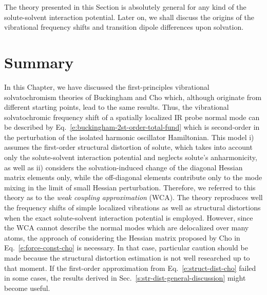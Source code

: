 \documentclass[a4paper,titlepage,twoside,fleqn,12pt]{book}
\begin{document}
\begin{refsection}
The theory presented in this Section is absolutely general 
for any kind of the solute\hyp{}solvent
interaction potential. Later on, we shall discuss the origins of the
vibrational frequency shifts and transition dipole differences
upon solvation.


\section{Summary}

In this Chapter, we have discussed the first\hyp{}principles
vibrational solvatochromism theories of Buckingham and Cho which,
although originate from different starting points, lead to the same results.
Thus, the vibrational solvatochromic frequency shift of a spatially localized 
IR probe normal mode can be described by Eq.~\eqref{e:buckingham-2st-order-total-fund}
which is second\hyp{}order in the perturbation of the isolated harmonic oscillator Hamiltonian.
This model i) assumes the first\hyp{}order structural distortion of solute, which takes 
into account only the solute\hyp{}solvent interaction potential and neglects
solute's anharmonicity, as well as ii) considers the solvation\hyp{}induced change of the diagonal
Hessian matrix elements only, while the off\hyp{}diagonal elements
contribute only to the mode mixing in the limit of small Hessian perturbation. 
Therefore, we referred to this theory
as to the \emph{weak coupling approximation} (WCA). The theory reproduces well the frequency shifts of
simple localized vibrations as well as structural distortions
when the exact solute\hyp{}solvent interaction potential
is employed. However, since the WCA cannot describe the normal modes
which are delocalized over many atoms, the approach of considering
the Hessian matrix proposed by Cho in Eq.~\eqref{e:force-const-cho} is necessary. 
In that case, particular caution should be made because the structural
distortion estimation is not well researched up to that moment. If the
first-order approximation from Eq.~\eqref{e:struct-dist-cho} failed in some cases, the results 
derived in Sec.~\ref{s:str-dist-general-discussion} might become useful.

\printbibliography[heading=subbibintoc,title={References}]
\end{refsection}
\end{document}

